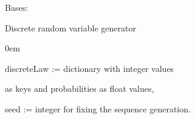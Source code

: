 \documentclass[letterpaper,10pt,english]{sphinxmanual}
\begin{document}

\begin{fulllineitems}
\label{techDoc:randomNumbers.DiscreteRandomVariable}
Bases: \href{http://docs.python.org/library/functions.html\#object}{}

Discrete random variable generator
\begin{description}
\item[{Parameters:}] \leavevmode
\begin{DUlineblock}{0em}
\item[] discreteLaw := dictionary with integer values
\item[]
\begin{DUlineblock}{\DUlineblockindent}
\item[] as keys and probabilities as float values,
\end{DUlineblock}
\item[] seed := integer for fixing the sequence generation.
\end{DUlineblock}


\end{description}
\end{fulllineitems}
\end{document}

